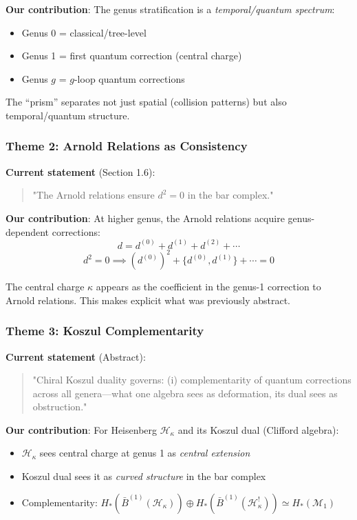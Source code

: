 \textbf{Our contribution}:
The genus stratification is a \emph{temporal/quantum spectrum}:
\begin{itemize}
\item Genus 0 = classical/tree-level
\item Genus 1 = first quantum correction (central charge)
\item Genus $g$ = $g$-loop quantum corrections
\end{itemize}

The ``prism'' separates not just spatial (collision patterns) but also temporal/quantum structure.

\subsubsection{Theme 2: Arnold Relations as Consistency}

\textbf{Current statement} (Section 1.6):
\begin{quote}
"The Arnold relations ensure $d^2 = 0$ in the bar complex."
\end{quote}

\textbf{Our contribution}:
At higher genus, the Arnold relations acquire genus-dependent corrections:
\begin{equation}
d = d^{(0)} + d^{(1)} + d^{(2)} + \cdots
\end{equation}
\begin{equation}
d^2 = 0 \implies (d^{(0)})^2 + \{d^{(0)}, d^{(1)}\} + \cdots = 0
\end{equation}

The central charge $\kappa$ appears as the coefficient in the genus-1 correction to Arnold relations. This makes explicit what was previously abstract.

\subsubsection{Theme 3: Koszul Complementarity}

\textbf{Current statement} (Abstract):
\begin{quote}
"Chiral Koszul duality governs: (i) complementarity of quantum corrections across all genera—what one algebra sees as deformation, its dual sees as obstruction."
\end{quote}

\textbf{Our contribution}:
For Heisenberg $\mathcal{H}_\kappa$ and its Koszul dual (Clifford algebra):
\begin{itemize}
\item $\mathcal{H}_\kappa$ sees central charge at genus 1 as \emph{central extension}
\item Koszul dual sees it as \emph{curved structure} in the bar complex
\item Complementarity: $H_*(\bar{B}^{(1)}(\mathcal{H}_\kappa)) \oplus H_*(\bar{B}^{(1)}(\mathcal{H}^\mathrm{!}_\kappa)) \simeq H_*(\mathcal{M}_1)$
\end{itemize}

